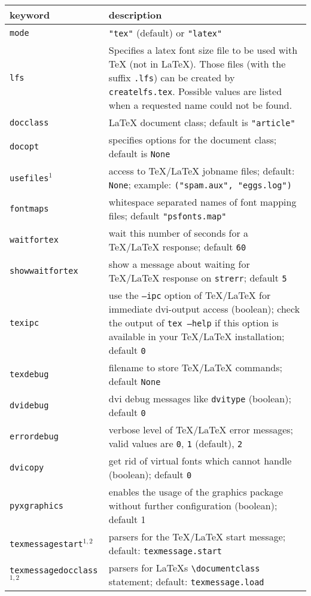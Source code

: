 \medskip
\begin{tabularx}{\linewidth}{l>{\raggedright\arraybackslash}X}
keyword&description\\
\hline
\texttt{mode}&\texttt{"tex"} (default) or \texttt{"latex"}\\
\texttt{lfs}&Specifies a latex font size file to be used with \TeX{} (not in \LaTeX). Those files (with the suffix \texttt{.lfs}) can be created by \texttt{createlfs.tex}. Possible values are listed when a requested name could not be found.\\
\texttt{docclass}&\LaTeX{} document class; default is \texttt{"article"}\\
\texttt{docopt}&specifies options for the document class; default is \texttt{None}\\
\texttt{usefiles}$^1$&access to \TeX/\LaTeX{} jobname files; default: \texttt{None}; example: \texttt{("spam.aux", "eggs.log")}\\
\texttt{fontmaps}&whitespace separated names of font mapping files; default \texttt{"psfonts.map"}\\
\texttt{waitfortex}&wait this number of seconds for a \TeX/\LaTeX{} response; default \texttt{60}\\
\texttt{showwaitfortex}&show a message about waiting for \TeX/\LaTeX{} response on \texttt{strerr}; default \texttt{5}\\
\texttt{texipc}&use the \texttt{--ipc} option of \TeX/\LaTeX{} for immediate dvi-output access (boolean); check the output of \texttt{tex --help} if this option is available in your \TeX/\LaTeX{} installation; default \texttt{0}\\
\texttt{texdebug}&filename to store \TeX/\LaTeX{} commands; default \texttt{None}\\
\texttt{dvidebug}&dvi debug messages like \texttt{dvitype} (boolean); default \texttt{0}\\
\texttt{errordebug}&verbose level of \TeX/\LaTeX{} error messages; valid values are \texttt{0}, \texttt{1} (default), \texttt{2}\\
\texttt{dvicopy}&get rid of virtual fonts which \PyX{} cannot handle (boolean); default \texttt{0}\\
\texttt{pyxgraphics}&enables the usage of the graphics package without further configuration (boolean); default 1\\
\texttt{texmessagestart}$^{1,2}$&parsers for the \TeX/\LaTeX{} start message; default: \texttt{texmessage.start}\\
\texttt{texmessagedocclass}$^{1,2}$&parsers for \LaTeX{}s \texttt{\textbackslash{}documentclass} statement; default: \texttt{texmessage.load}\\

\end{tabularx}
